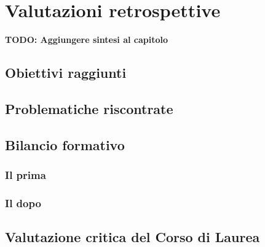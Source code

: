 
\chapter{Valutazioni retrospettive}
\label{cap:valutazioni-retrospettive}
\textbf{TODO: Aggiungere sintesi al capitolo}\\


\section{Obiettivi raggiunti}

\section{Problematiche riscontrate}

\section{Bilancio formativo}
\subsection{Il prima}
\subsection{Il dopo}

\section{Valutazione critica del Corso di Laurea}



\newpage
